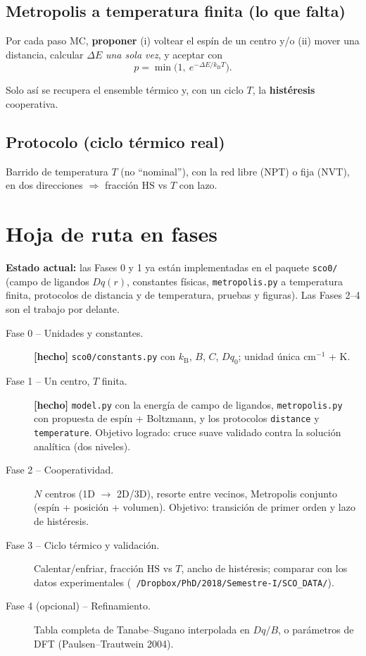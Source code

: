 \documentclass[11pt,a4paper]{article}
\newcommand{\HS}{\mathrm{HS}}
\newcommand{\Dq}{Dq}
\newcommand{\kb}{k_{\mathrm{B}}}
\begin{document}
\subsection{Metropolis a temperatura finita (lo que falta)}

Por cada paso MC, \textbf{proponer} (i) voltear el espín de un centro y/o (ii)
mover una distancia, calcular $\Delta E$ \emph{una sola vez}, y aceptar con
\begin{equation}
p = \min\!\bigl(1,\ e^{-\Delta E/\kb T}\bigr) .
\end{equation}

Solo así se recupera el ensemble térmico y, con un ciclo $T$, la
\textbf{histéresis} cooperativa.

\subsection{Protocolo (ciclo térmico real)}

Barrido de temperatura $T$ (no ``nominal''), con la red libre (NPT) o fija (NVT),
en dos direcciones $\Rightarrow$ fracción $\HS$ vs $T$ con lazo.

\section{Hoja de ruta en fases}

\noindent\textbf{Estado actual:} las Fases 0 y 1 ya están implementadas en el
paquete \texttt{sco0/} (campo de ligandos $\Dq(r)$, constantes físicas,
\texttt{metropolis.py} a temperatura finita, protocolos de distancia y de
temperatura, pruebas y figuras). Las Fases 2--4 son el trabajo por delante.

\begin{description}
\item[Fase 0 -- Unidades y constantes.] \textbf{[hecho]} \texttt{sco0/constants.py}
  con $\kb$, $B$, $C$, $Dq_0$; unidad única cm$^{-1}$ + K.
\item[Fase 1 -- Un centro, $T$ finita.] \textbf{[hecho]}
  \texttt{model.py} con la energía de campo de ligandos, \texttt{metropolis.py}
  con propuesta de espín + Boltzmann, y los protocolos \texttt{distance} y
  \texttt{temperature}. Objetivo logrado: cruce suave validado contra la solución
  analítica (dos niveles).
\item[Fase 2 -- Cooperatividad.] $N$ centros (1D $\to$ 2D/3D), resorte entre
  vecinos, Metropolis conjunto (espín + posición + volumen). Objetivo: transición
  de primer orden y lazo de histéresis.
\item[Fase 3 -- Ciclo térmico y validación.] Calentar/enfriar, fracción $\HS$ vs
  $T$, ancho de histéresis; comparar con los datos experimentales
  (\texttt{~/Dropbox/PhD/2018/Semestre-I/SCO\_DATA/}).
\item[Fase 4 (opcional) -- Refinamiento.] Tabla completa de Tanabe--Sugano
  interpolada en $\Dq/B$, o parámetros de DFT (Paulsen--Trautwein 2004).
\end{description}
\end{document}
